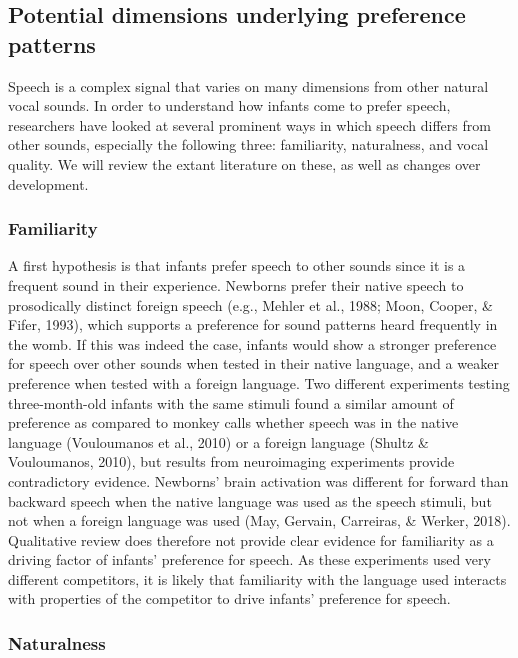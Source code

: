 \documentclass[man]{apa6}
\begin{document}
\subsection{Potential dimensions underlying preference
patterns}\label{potential-dimensions-underlying-preference-patterns}

Speech is a complex signal that varies on many dimensions from other
natural vocal sounds. In order to understand how infants come to prefer
speech, researchers have looked at several prominent ways in which
speech differs from other sounds, especially the following three:
familiarity, naturalness, and vocal quality. We will review the extant
literature on these, as well as changes over development.

\subsubsection{Familiarity}\label{familiarity}

A first hypothesis is that infants prefer speech to other sounds since
it is a frequent sound in their experience. Newborns prefer their native
speech to prosodically distinct foreign speech (e.g., Mehler et al.,
1988; Moon, Cooper, \& Fifer, 1993), which supports a preference for
sound patterns heard frequently in the womb. If this was indeed the
case, infants would show a stronger preference for speech over other
sounds when tested in their native language, and a weaker preference
when tested with a foreign language. Two different experiments testing
three-month-old infants with the same stimuli found a similar amount of
preference as compared to monkey calls whether speech was in the native
language (Vouloumanos et al., 2010) or a foreign language (Shultz \&
Vouloumanos, 2010), but results from neuroimaging experiments provide
contradictory evidence. Newborns' brain activation was different for
forward than backward speech when the native language was used as the
speech stimuli, but not when a foreign language was used (May, Gervain,
Carreiras, \& Werker, 2018). Qualitative review does therefore not
provide clear evidence for familiarity as a driving factor of infants'
preference for speech. As these experiments used very different
competitors, it is likely that familiarity with the language used
interacts with properties of the competitor to drive infants' preference
for speech.

\subsubsection{Naturalness}\label{naturalness}
\end{document}
